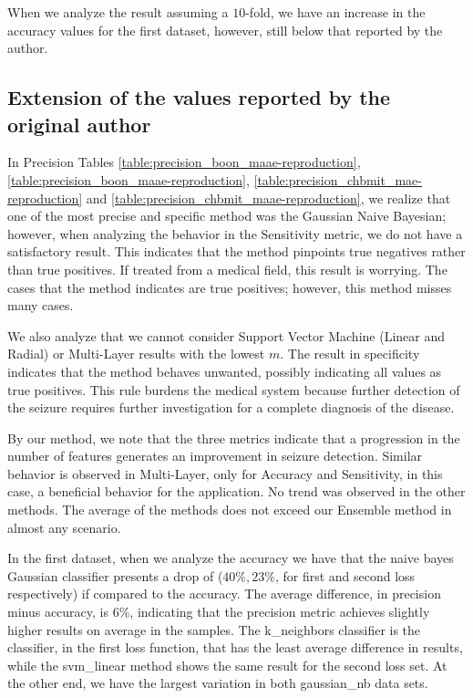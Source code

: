 

When we analyze the result assuming a $10$-fold, we have an increase in the accuracy values for the first dataset, however, still below that reported by the author.

\subsection{Extension of the values reported by the original author}
 
In Precision Tables \ref{table:precision_boon_maae-reproduction}, \ref{table:precision_boon_maae-reproduction}, \ref{table:precision_chbmit_mae-reproduction} and \ref{table:precision_chbmit_maae-reproduction}, we realize that one of the most precise and specific method was the Gaussian Naive Bayesian; however, when analyzing the behavior in the Sensitivity metric, we do not have a satisfactory result. This indicates that the method pinpoints true negatives rather than true positives. If treated from a medical field, this result is worrying. The cases that the method indicates are true positives; however, this method misses many cases.

We also analyze that we cannot consider Support Vector Machine (Linear and Radial) or Multi-Layer results with the lowest $m$. The result in specificity indicates that the method behaves unwanted, possibly indicating all values as true positives. This rule burdens the medical system because further detection of the seizure requires further investigation for a complete diagnosis of the disease.

By our method, we note that the three metrics indicate that a progression in the number of features generates an improvement in seizure detection. Similar behavior is observed in Multi-Layer, only for Accuracy and Sensitivity, in this case, a beneficial behavior for the application. No trend was observed in the other methods. The average of the methods does not exceed our Ensemble method in almost any scenario. 







In the first dataset, when we analyze the accuracy we have that the naive bayes Gaussian classifier presents a drop of ($ 40 \%, 23 \% $, for first and second loss respectively) if compared to the accuracy. The average difference, in precision minus accuracy, is $6\%$, indicating that the precision metric achieves slightly higher results on average in the samples. The k\_neighbors classifier is the classifier, in the first loss function, that has the least average difference in results, while the svm\_linear method shows the same result for the second loss set. At the other end, we have the largest variation in both gaussian\_nb data sets.


